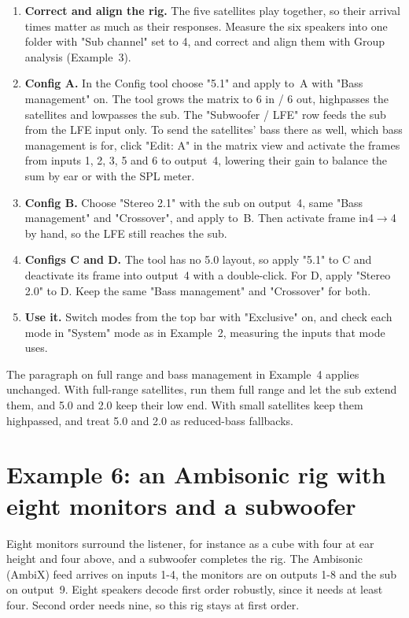 \begin{enumerate}[nosep]
  \item \textbf{Correct and align the rig.} The five satellites play together, so their arrival times matter as much as their responses. Measure the six speakers into one folder with "Sub channel" set to 4, and correct and align them with Group analysis (Example~3).
  \item \textbf{Config A.} In the Config tool choose "5.1" and apply to~A with "Bass management" on. The tool grows the matrix to 6 in / 6 out, highpasses the satellites and lowpasses the sub. The "Subwoofer / LFE" row feeds the sub from the LFE input only. To send the satellites' bass there as well, which bass management is for, click "Edit: A" in the matrix view and activate the frames from inputs 1, 2, 3, 5 and 6 to output~4, lowering their gain to balance the sum by ear or with the SPL meter.
  \item \textbf{Config B.} Choose "Stereo 2.1" with the sub on output~4, same "Bass management" and "Crossover", and apply to~B. Then activate frame in4$\rightarrow$4 by hand, so the LFE still reaches the sub.
  \item \textbf{Configs C and D.} The tool has no 5.0 layout, so apply "5.1" to C and deactivate its frame into output~4 with a double-click. For D, apply "Stereo 2.0" to D. Keep the same "Bass management" and "Crossover" for both.
  \item \textbf{Use it.} Switch modes from the top bar with "Exclusive" on, and check each mode in "System" mode as in Example~2, measuring the inputs that mode uses.
\end{enumerate}

\noindent The paragraph on full range and bass management in Example~4 applies unchanged. With full-range satellites, run them full range and let the sub extend them, and 5.0 and 2.0 keep their low end. With small satellites keep them highpassed, and treat 5.0 and 2.0 as reduced-bass fallbacks.

\section{Example 6: an Ambisonic rig with eight monitors and a subwoofer}\label{sec:ex-ambi}

Eight monitors surround the listener, for instance as a cube with four at ear height and four above, and a subwoofer completes the rig. The Ambisonic (AmbiX) feed arrives on inputs 1-4, the monitors are on outputs 1-8 and the sub on output~9. Eight speakers decode first order robustly, since it needs at least four. Second order needs nine, so this rig stays at first order.

